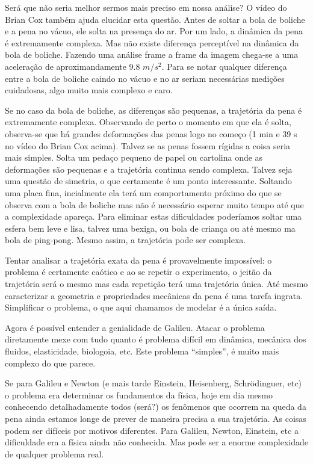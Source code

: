 \documentclass[article,12pt,oneside,a4paper,english,brazil,sumario=tradicional]{abntex2}
\begin{document}
Será que não seria melhor sermos mais preciso em nossa análise? O vídeo do Brian Cox também ajuda elucidar esta questão. Antes de soltar a bola de boliche e a pena no vácuo, ele solta na presença do ar. Por um lado, a dinâmica da pena é extremamente complexa. Mas não existe diferença perceptível na dinâmica da bola de boliche. Fazendo uma análise frame a frame da imagem chega-se a uma aceleração de aproximandamente 9.8 $m/s^2$. Para se notar qualquer diferença entre a bola de boliche caindo no vácuo e no ar seriam necessárias medições cuidadosas, algo muito mais complexo e caro.

Se no caso da bola de boliche, as diferenças são pequenas, a trajetória da pena é extremamente complexa. Observando de perto o momento em que ela é solta, observa-se que há grandes deformações das penas logo no começo (1 min e 39 s no vídeo do Brian Cox acima). Talvez se as penas fossem rígidas a coisa seria mais simples. Solta um pedaço pequeno de papel ou cartolina onde as deformações são pequenas e a trajetória continua sendo complexa. Talvez seja uma questão de simetria, o que certamente é um ponto interessante. Soltando uma placa fina, incialmente ela terá um comportamento próximo do que se observa com a bola de boliche mas não é necessário esperar muito tempo até que a complexidade apareça. Para eliminar estas dificuldades poderíamos soltar uma esfera bem leve e lisa, talvez uma bexiga, ou bola de criança ou até mesmo ma bola de ping-pong. Mesmo assim, a trajetória pode ser complexa.


Tentar analisar a trajetória exata da pena é provavelmente impossível: o problema é certamente caótico e ao se repetir o experimento, o jeitão da trajetória será o mesmo mas cada repetição terá uma trajetória única. Até mesmo caracterizar a geometria e propriedades mecânicas da pena é uma tarefa ingrata. Simplificar o problema, o que aqui chamamos de modelar é a única saída.

Agora é possível entender a genialidade de Galileu. Atacar o problema diretamente mexe com tudo quanto é problema difícil em dinâmica, mecânica dos fluidos, elasticidade, biologoia, etc. Este problema ``simples'', é muito mais complexo do que parece.

Se para Galileu e Newton (e mais tarde Einstein, Heisenberg, Schrödinguer, etc) o problema era determinar os fundamentos da física, hoje em dia mesmo conhecendo detalhadamente todos (será?) os fenômenos que ocorrem na queda da pena ainda estamos longe de prever de maneira precisa a sua trajetória. As coisas podem ser difíceis por motivos diferentes. Para Galileu, Newton, Einstein, etc a dificuldade era a física ainda não conhecida. Mas pode ser a enorme complexidade de qualquer problema real.
\end{document}

